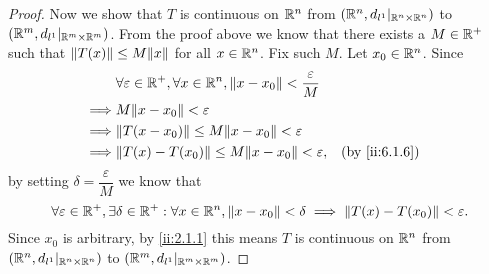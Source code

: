 \begin{proof}
  Now we show that \(T\) is continuous on \(\R^n\) from \((\R^n, d_{l^1}|_{\R^n \times \R^n})\) to \((\R^m, d_{l^1}|_{\R^m \times \R^m})\).
  From the proof above we know that there exists a \(M \in \R^+\) such that \(\norm*{T(x)} \leq M \norm*{x}\) for all \(x \in \R^n\).
  Fix such \(M\).
  Let \(x_0 \in \R^n\).
  Since
  \begin{align*}
             & \forall \varepsilon \in \R^+, \forall x \in \R^n, \norm*{x - x_0} < \dfrac{\varepsilon}{M}                    \\
    \implies & M \norm*{x - x_0} < \varepsilon                                                                               \\
    \implies & \norm*{T(x - x_0)} \leq M \norm*{x - x_0} < \varepsilon                                                       \\
    \implies & \norm*{T(x) - T(x_0)} \leq M \norm*{x - x_0} < \varepsilon,                                &  & \by{ii:6.1.6}
  \end{align*}
  by setting \(\delta = \dfrac{\varepsilon}{M}\) we know that
  \[
    \forall \varepsilon \in \R^+, \exists \delta \in \R^+ : \forall x \in \R^n, \norm*{x - x_0} < \delta \implies \norm*{T(x) - T(x_0)} < \varepsilon.
  \]
  Since \(x_0\) is arbitrary, by \cref{ii:2.1.1} this means \(T\) is continuous on \(\R^n\) from \((\R^n, d_{l^1}|_{\R^n \times \R^n})\) to \((\R^m, d_{l^1}|_{\R^m \times \R^m})\).
\end{proof}
